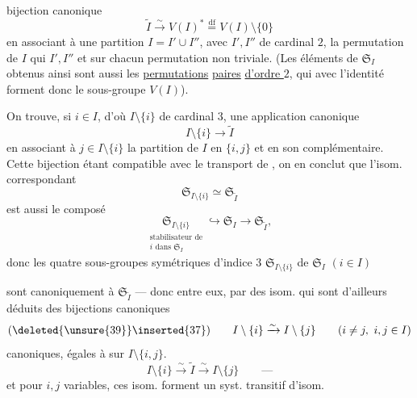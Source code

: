 
bijection canonique
\[
\tag{33}
\widetilde I \xrightarrow{\sim} V(I)^*
\overset{\mathrm{df}}{=} V(I)\setminus\{0\}
\]
en associant à une partition $I=I'\cup I''$, avec
$I',I''$ de cardinal $2$, la  permutation
 de $I$
 qui  $I',I''$ et  sur
chacun  permutation non triviale. (Les éléments
de $\mathfrak{S}_I$ obtenus ainsi sont aussi les \uline{permutations}
\uline{paires} \uline{d'ordre $2$}, \deleted{\unsure{)}} qui avec l'identité forment
donc le sous-groupe $V(I)$).

On trouve, si $i\in I$, d'où $I\setminus\{i\}$ de
cardinal $3$,  une application canonique
\[
\tag{34}
I\setminus\{i\}\longrightarrow\widetilde I
\]
en associant à $j\in I\setminus\{i\}$ la partition
de $I$ en $\{i,j\}$ et en son complémentaire.
Cette bijection étant compatible avec le
transport de , on en conclut
que l'isom. correspondant
\[
\tag{35}
\mathfrak{S}_{I\setminus\{i\}}\simeq\mathfrak{S}_{\widetilde I}
\]
 est  aussi le composé
\[
\tag{36}
\underset{\substack{\text{stabilisateur de}\\ i\text{ dans }\mathfrak{S}_I}}
{\mathfrak{S}_{I\setminus\{i\}}}
\hookrightarrow\mathfrak{S}_I\longrightarrow\mathfrak{S}_{\widetilde I},
\]
donc les quatre sous-groupes symétriques
d'indice $3$ $\mathfrak{S}_{I\setminus\{i\}}$ de $\mathfrak{S}_I$ $(i\in I)$

sont canoniquement  à $\mathfrak{S}_{\widetilde I}$
--- donc entre eux,  par des isom. qui
 sont  d'ailleurs  déduits des bijections
canoniques 
\[
  (\deleted{\unsure{39}}\inserted{37})\qquad
  I\setminus\{i\}\xrightarrow{\sim}I\setminus\{j\}
  \qquad(i\ne j,\ i,j\in I)
\]
canoniques, égales à 
 sur $I\setminus\{i,j\}$.
\[
  I\setminus\{i\}\xrightarrow{\sim}\widetilde I
  \xrightarrow{\sim}I\setminus\{j\}
  \qquad\text{---}
\]
et pour $i,j$ variables, ces isom. forment un
syst. transitif d'isom.

